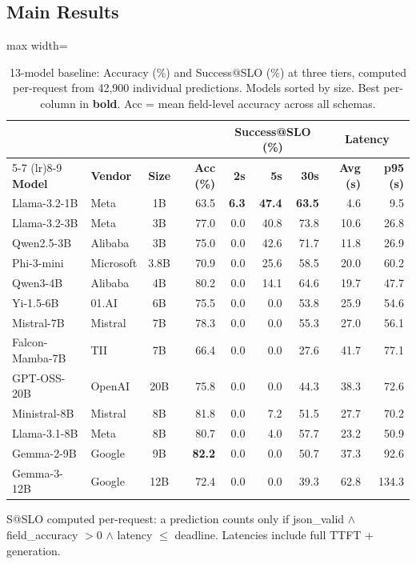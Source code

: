 \documentclass[11pt]{article}
\begin{document}
\subsection{Main Results}

\begin{table}[t]
\centering
\caption{13-model baseline: Accuracy (\%) and Success@SLO (\%) at three tiers, computed per-request from 42{,}900 individual predictions.  Models sorted by size.  Best per-column in \textbf{bold}.  Acc = mean field-level accuracy across all schemas.}
\label{tab:main-results}
\small
\begin{adjustbox}{max width=\textwidth}
\begin{tabular}{llc r rrr rr}
\toprule
& & & & \multicolumn{3}{c}{\textbf{Success@SLO (\%)}} & \multicolumn{2}{c}{\textbf{Latency}} \\
\cmidrule(lr){5-7} \cmidrule(lr){8-9}
\textbf{Model} & \textbf{Vendor} & \textbf{Size} & \textbf{Acc (\%)} & \textbf{2s} & \textbf{5s} & \textbf{30s} & \textbf{Avg (s)} & \textbf{p95 (s)} \\
\midrule
Llama-3.2-1B    & Meta      & 1B   & 63.5 & \textbf{6.3} & \textbf{47.4} & \textbf{63.5} & 4.6 & 9.5 \\
Llama-3.2-3B    & Meta      & 3B   & 77.0 & 0.0 & 40.8 & 73.8 & 10.6 & 26.8 \\
Qwen2.5-3B      & Alibaba   & 3B   & 75.0 & 0.0 & 42.6 & 71.7 & 11.8 & 26.9 \\
Phi-3-mini       & Microsoft & 3.8B & 70.9 & 0.0 & 25.6 & 58.5 & 20.0 & 60.2 \\
Qwen3-4B         & Alibaba   & 4B   & 80.2 & 0.0 & 14.1 & 64.6 & 19.7 & 47.7 \\
Yi-1.5-6B        & 01.AI     & 6B   & 75.5 & 0.0 & 0.0  & 53.8 & 25.9 & 54.6 \\
Mistral-7B       & Mistral   & 7B   & 78.3 & 0.0 & 0.0  & 55.3 & 27.0 & 56.1 \\
Falcon-Mamba-7B  & TII       & 7B   & 66.4 & 0.0 & 0.0  & 27.6 & 41.7 & 77.1 \\
GPT-OSS-20B      & OpenAI    & 20B  & 75.8 & 0.0 & 0.0  & 44.3 & 38.3 & 72.6 \\
Ministral-8B     & Mistral   & 8B   & 81.8 & 0.0 & 7.2  & 51.5 & 27.7 & 70.2 \\
Llama-3.1-8B     & Meta      & 8B   & 80.7 & 0.0 & 4.0  & 57.7 & 23.2 & 50.9 \\
Gemma-2-9B       & Google    & 9B   & \textbf{82.2} & 0.0 & 0.0  & 50.7 & 37.3 & 92.6 \\
Gemma-3-12B      & Google    & 12B  & 72.4 & 0.0 & 0.0  & 39.3 & 62.8 & 134.3 \\
\bottomrule
\end{tabular}
\end{adjustbox}
\vspace{0.3em}

\footnotesize{S@SLO computed per-request: a prediction counts only if json\_valid $\wedge$ field\_accuracy $> 0$ $\wedge$ latency $\leq$ deadline.  Latencies include full TTFT + generation.}
\end{table}
\end{document}
